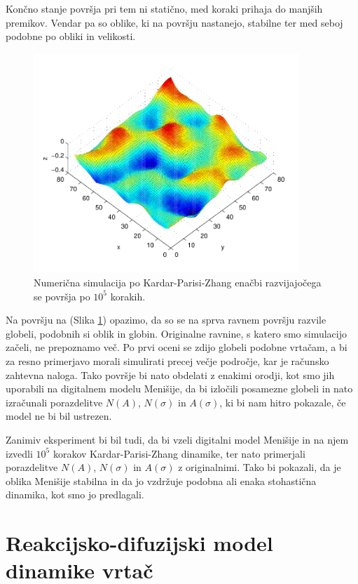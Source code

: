 \documentclass[a4paper, twoside, 12pt]{book}
\begin{document}
Končno stanje površja pri tem ni statično, med koraki prihaja do manjših premikov. Vendar pa so oblike, ki na površju nastanejo, stabilne ter med seboj podobne po obliki in velikosti.

    \begin{figure}[h]
      \begin{center}
        \includegraphics[width=10cm]{slike/KPZ-numericno}
      \end{center}
      \caption{Numerična simulacija po Kardar-Parisi-Zhang enačbi razvijajočega se površja po $10^5$ korakih.}
      \label{fig:KPZ-numericno}
    \end{figure}

Na površju na (Slika \ref{fig:KPZ-numericno}) opazimo, da so se na sprva ravnem površju razvile globeli, podobnih si oblik in globin. Originalne ravnine, s katero smo simulacijo začeli, ne prepoznamo več. Po prvi oceni se zdijo globeli podobne vrtačam, a bi za resno primerjavo morali simulirati precej večje področje, kar je računsko zahtevna naloga. Tako površje bi nato obdelati z enakimi orodji, kot smo jih uporabili na digitalnem modelu Menišije, da bi izločili posamezne globeli in nato izračunali porazdelitve $N(A)$, $N(\sigma)$ in $A(\sigma)$, ki bi nam hitro pokazale, če model ne bi bil ustrezen.

Zanimiv eksperiment bi bil tudi, da bi vzeli digitalni model Menišije in na njem izvedli $10^5$ korakov Kardar-Parisi-Zhang dinamike, ter nato primerjali porazdelitve $N(A)$, $N(\sigma)$ in $A(\sigma)$ z originalnimi. Tako bi pokazali, da je oblika Menišije stabilna in da jo vzdržuje podobna ali enaka stohastična dinamika, kot smo jo predlagali.


\section{Reakcijsko-difuzijski model dinamike vrtač}
\end{document}
